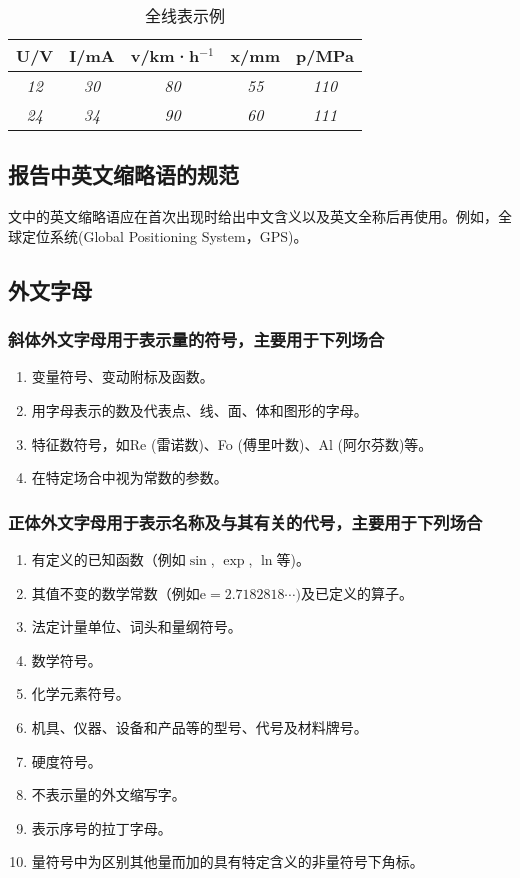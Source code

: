 \documentclass{thuemp}
\begin{document}
\begin{table}[h]
\centering
\captionnamefont{\wuhao\bf\heiti}
\captiontitlefont{\wuhao\bf\heiti}
\caption{全线表示例} \label{tab:eg2}
\liuhao
\begin{tabular}{|c|c|c|c|c|}
\hline
U/V & I/mA & v/km·h$^{-1}$ & x/mm & p/MPa \\ \hline
\textit{12} & \textit{30} & \textit{80} & \textit{55} & \textit{110} \\ \hline
\textit{24} & \textit{34} & \textit{90} & \textit{60} & \textit{111} \\ \hline
\end{tabular}
\end{table}

\subsection{报告中英文缩略语的规范}
文中的英文缩略语应在首次出现时给出中文含义以及英文全称后再使用。例如，全球定位系统(Global Positioning System，GPS)。


\subsection{外文字母}
\subsubsection{斜体外文字母用于表示量的符号，主要用于下列场合}

\begin{enumerate}
\renewcommand{\labelenumi}{(\theenumi)}
\item 变量符号、变动附标及函数。
\item 用字母表示的数及代表点、线、面、体和图形的字母。
\item 特征数符号，如Re (雷诺数)、Fo (傅里叶数)、Al (阿尔芬数)等。
\item 在特定场合中视为常数的参数。
\end{enumerate} 

\subsubsection{正体外文字母用于表示名称及与其有关的代号，主要用于下列场合}
\begin{enumerate}
\renewcommand{\labelenumi}{(\theenumi)}
\item 有定义的已知函数（例如$\sin$, $\exp$, $\ln$等)。
\item 其值不变的数学常数（例如$\mathrm{e} = 2.718 281 8\cdots)$及已定义的算子。
\item 法定计量单位、词头和量纲符号。
\item 数学符号。
\item 化学元素符号。
\item 机具、仪器、设备和产品等的型号、代号及材料牌号。
\item 硬度符号。
\item 不表示量的外文缩写字。
\item 表示序号的拉丁字母。
\item 量符号中为区别其他量而加的具有特定含义的非量符号下角标。
\end{enumerate} 
\end{document}
